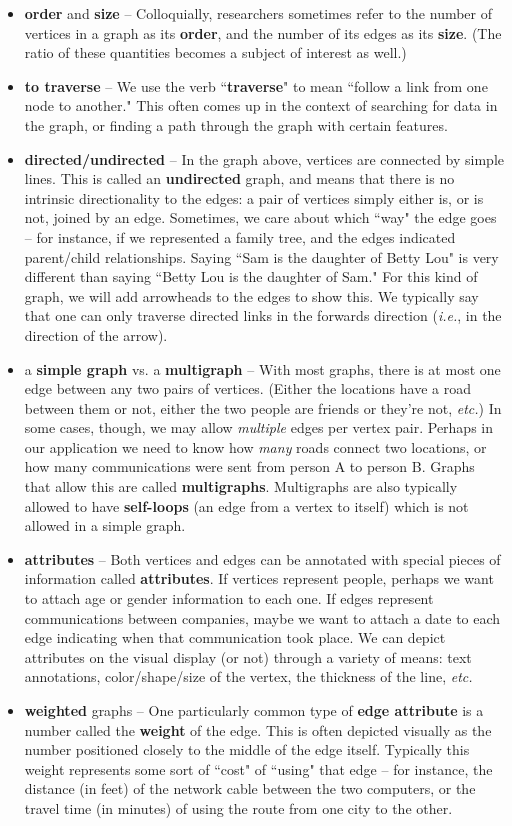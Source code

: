 \documentclass[12pt]{article}
\begin{document}
\begin{itemize}
\itemsep.1em
\item \textbf{order} and \textbf{size} -- Colloquially, researchers sometimes
refer to the number of vertices in a graph as its \textbf{order}, and the
number of its edges as its \textbf{size}. (The ratio of these quantities
becomes a subject of interest as well.)
\item \textbf{to traverse} -- We use the verb ``\textbf{traverse}" to mean
``follow a link from one node to another." This often comes up in the context
of searching for data in the graph, or finding a path through the graph with
certain features.
\item \textbf{directed/undirected} -- In the graph above, vertices are
connected by simple lines. This is called an \textbf{undirected} graph, and
means that there is no intrinsic directionality to the edges: a pair of
vertices simply either is, or is not, joined by an edge. Sometimes, we care
about which ``way" the edge goes -- for instance, if we represented a family
tree, and the edges indicated parent/child relationships. Saying ``Sam is the
daughter of Betty Lou" is very different than saying ``Betty Lou is the
daughter of Sam." For this kind of graph, we will add arrowheads to the edges
to show this. We typically say that one can only traverse directed links in
the forwards direction (\textit{i.e.}, in the direction of the arrow).
\item a \textbf{simple graph} vs. a \textbf{multigraph} -- With most graphs,
there is at most one edge between any two pairs of vertices. (Either the
locations have a road between them or not, either the two people are friends
or they're not, \textit{etc.}) In some cases, though, we may allow
\textit{multiple} edges per vertex pair. Perhaps in our application we need to
know how \textit{many} roads connect two locations, or how many communications
were sent from person A to person B. Graphs that allow this are called
\textbf{multigraphs}. Multigraphs are also typically allowed to have
\textbf{self-loops} (an edge from a vertex to itself) which is not allowed in
a simple graph.
\item \textbf{attributes} -- Both vertices and edges can be annotated with
special pieces of information called \textbf{attributes}. If vertices
represent people, perhaps we want to attach age or gender information to each
one. If edges represent communications between companies, maybe we want to
attach a date to each edge indicating when that communication took place. We
can depict attributes on the visual display (or not) through a variety of
means: text annotations, color/shape/size of the vertex, the thickness of the
line, \textit{etc.}
\item \textbf{weighted} graphs -- One particularly common type of \textbf{edge
attribute} is a number called the \textbf{weight} of the edge. This is often
depicted visually as the number positioned closely to the middle of the edge
itself. Typically this weight represents some sort of ``cost" of ``using" that
edge -- for instance, the distance (in feet) of the network cable between the
two computers, or the travel time (in minutes) of using the route from one
city to the other.
\end{itemize}
\end{document}
